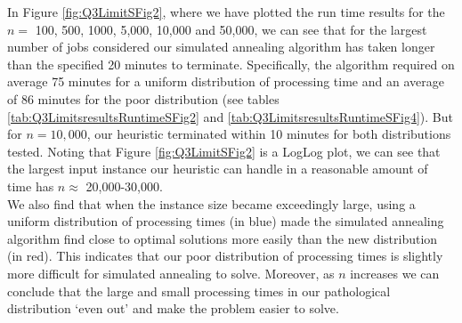 \documentclass[12pt,a4paper,reqno]{article}
\begin{document}
In Figure \ref{fig:Q3LimitSFig2}, where we have plotted the run time results for the $n=$ 100, 500, 1000, 5,000, 10,000 and 50,000, we can see that for the largest number of jobs considered our simulated annealing algorithm has taken longer than the specified 20 minutes to terminate. Specifically, the algorithm required on average 75 minutes for a uniform distribution of processing time and an average of 86 minutes for the poor distribution (see tables \ref{tab:Q3LimitsresultsRuntimeSFig2} and \ref{tab:Q3LimitsresultsRuntimeSFig4}). But for $n=10,000$, our heuristic terminated within 10 minutes for both distributions tested. Noting that Figure \ref{fig:Q3LimitSFig2} is a LogLog plot, we can see that the largest input instance our heuristic can handle in a reasonable amount of time has $n\approx$ 20,000-30,000. \\

We also find that when the instance size became exceedingly large, using a uniform distribution of processing times (in blue) made the simulated annealing algorithm find close to optimal solutions more easily than the new distribution (in red). This indicates that our poor distribution of processing times is slightly more difficult for simulated annealing to solve. Moreover, as $n$ increases we can conclude that the large and small processing times in our pathological distribution `even out' and make the problem easier to solve.
\end{document}

